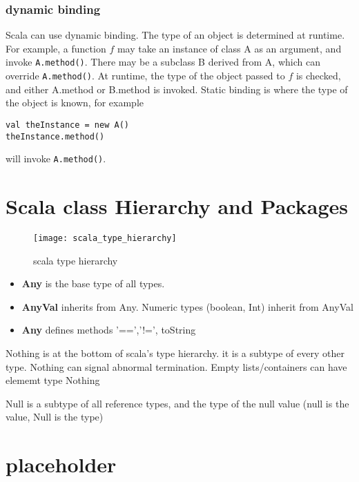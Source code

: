 \subsection{dynamic binding}
Scala can use dynamic binding. The type of an object is determined at runtime. For example, a function $f$ may take an instance of class A as an argument, and invoke \lstinline|A.method()|. There may be a subclass B derived from A, which can override \lstinline{A.method()}. At runtime, the type of the object passed to $f$ is checked, and either A.method or B.method is invoked. Static binding is where the type of the object is known, for example 
\begin{lstlisting}
val theInstance = new A()
theInstance.method()
\end{lstlisting} 
will invoke \lstinline|A.method()|. 

\chapter{Scala class Hierarchy and Packages}

\begin{figure}[hbp]
\texttt{[image: scala\_type\_hierarchy]}
\caption{scala type hierarchy}
\end{figure}


\begin{itemize}
\item { \bf Any} is the base type of all types.
\item {\bf AnyVal} inherits from Any. Numeric types (boolean, Int) inherit from AnyVal
\item {\bf Any} defines methods '==','!=', toString
\end{itemize}

Nothing is at the bottom of scala's type hierarchy. it is a subtype of every other type.
Nothing can signal abnormal termination.
Empty lists/containers can have elememt type Nothing

Null is a subtype of all reference types, and the type of the null value
(null is the value, Null is the type)



\chapter{placeholder}

